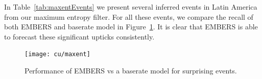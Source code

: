 In Table~\ref{tab:maxentEvents} we present several inferred events in Latin America from our maximum entropy
filter.
For all these events, we compare the recall of both EMBERS and baserate model
in Figure~\ref{fig:maxent}.
It is clear that EMBERS is able to forecast these significant upticks consistently.

\begin{figure}[H]
\centering
\texttt{[image: cu/maxent]}
\caption{Performance of EMBERS vs a baserate model for surprising events.}
\label{fig:maxent}
\end{figure}
